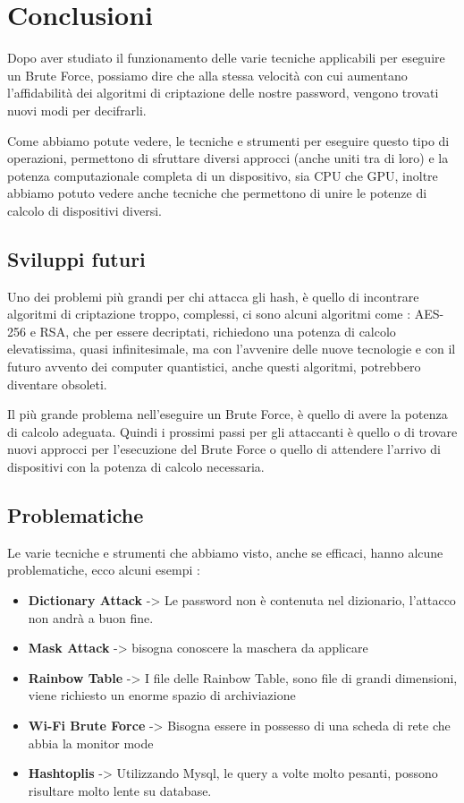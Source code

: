 \chapter{Conclusioni}

Dopo aver studiato il funzionamento delle varie tecniche applicabili per eseguire un Brute Force, possiamo dire che alla stessa velocità con cui aumentano l'affidabilità dei algoritmi di criptazione delle nostre password, vengono trovati nuovi modi per decifrarli.

Come abbiamo potute vedere, le tecniche e strumenti per eseguire questo tipo di operazioni, permettono di sfruttare diversi approcci (anche uniti tra di loro) e la potenza computazionale completa di un dispositivo, sia CPU che GPU, inoltre abbiamo potuto vedere anche tecniche che permettono di unire le potenze di calcolo di dispositivi diversi.

\section{Sviluppi futuri}

Uno dei problemi più grandi per chi attacca gli hash, è quello di incontrare algoritmi di criptazione troppo, complessi, ci sono alcuni algoritmi come : AES-256 e RSA, che per essere decriptati, richiedono una potenza di calcolo elevatissima, quasi infinitesimale, ma con l'avvenire delle nuove tecnologie e con il futuro avvento dei computer quantistici, anche questi algoritmi, potrebbero diventare obsoleti.

Il più grande problema nell'eseguire un Brute Force, è quello di avere la potenza di calcolo adeguata. Quindi i prossimi passi per gli attaccanti è quello o di trovare nuovi approcci per l'esecuzione del Brute Force o quello di attendere l'arrivo di dispositivi con la potenza di calcolo necessaria.

\section{Problematiche}

Le varie tecniche e strumenti che abbiamo visto, anche se efficaci, hanno alcune problematiche, ecco alcuni esempi :

\begin{itemize}
    \item \textbf{Dictionary Attack} -> Le password non è contenuta nel dizionario, l'attacco non andrà a buon fine.
    \item \textbf{Mask Attack} -> bisogna conoscere la maschera da applicare
    \item \textbf{Rainbow Table } -> I file delle Rainbow Table, sono file di grandi dimensioni, viene richiesto un enorme spazio di archiviazione
    \item \textbf{Wi-Fi Brute Force} -> Bisogna essere in possesso di una scheda di rete che abbia la monitor mode
    \item \textbf{Hashtoplis } -> Utilizzando Mysql, le query a volte molto pesanti, possono risultare molto lente su database.
\end{itemize}


